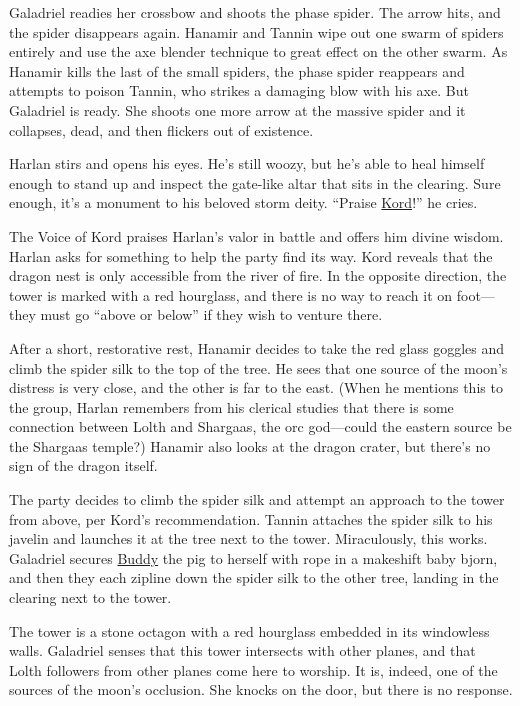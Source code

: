 \documentclass[smalldemyvopaper,11pt,twoside,onecolumn,openright,extrafontsizes]{memoir}
\begin{document}
Galadriel readies her crossbow and shoots the phase spider. The arrow
hits, and the spider disappears again. Hanamir and Tannin wipe out one
swarm of spiders entirely and use the axe blender technique to great
effect on the other swarm. As Hanamir kills the last of the small
spiders, the phase spider reappears and attempts to poison Tannin, who
strikes a damaging blow with his axe. But Galadriel is ready. She shoots
one more arrow at the massive spider and it collapses, dead, and then
flickers out of existence.

Harlan stirs and opens his eyes. He's still woozy, but he's able to heal
himself enough to stand up and inspect the gate-like altar that sits in
the clearing. Sure enough, it's a monument to his beloved storm deity.
``Praise \href{/characters/kord/}{Kord}!'' he cries.

The Voice of Kord praises Harlan's valor in battle and offers him divine
wisdom. Harlan asks for something to help the party find its way. Kord
reveals that the dragon nest is only accessible from the river of fire.
In the opposite direction, the tower is marked with a red hourglass, and
there is no way to reach it on foot---they must go ``above or below'' if
they wish to venture there.

After a short, restorative rest, Hanamir decides to take the red glass
goggles and climb the spider silk to the top of the tree. He sees that
one source of the moon's distress is very close, and the other is far to
the east. (When he mentions this to the group, Harlan remembers from his
clerical studies that there is some connection between Lolth and
Shargaas, the orc god---could the eastern source be the Shargaas
temple?) Hanamir also looks at the dragon crater, but there's no sign of
the dragon itself.

The party decides to climb the spider silk and attempt an approach to
the tower from above, per Kord's recommendation. Tannin attaches the
spider silk to his javelin and launches it at the tree next to the
tower. Miraculously, this works. Galadriel secures
\href{/characters/buddy/}{Buddy} the pig to herself with rope in a
makeshift baby bjorn, and then they each zipline down the spider silk to
the other tree, landing in the clearing next to the tower.

The tower is a stone octagon with a red hourglass embedded in its
windowless walls. Galadriel senses that this tower intersects with other
planes, and that Lolth followers from other planes come here to worship.
It is, indeed, one of the sources of the moon's occlusion. She knocks on
the door, but there is no response.
\end{document}

